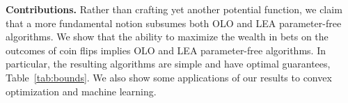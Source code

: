 \textbf{Contributions.} Rather than crafting yet another potential function, we claim that a more fundamental notion
subsumes both \ac{OLO} and \ac{LEA} parameter-free algorithms. We show that the ability to maximize the wealth in bets on the outcomes of coin flips implies \ac{OLO} and \ac{LEA} parameter-free algorithms.
In particular, the resulting algorithms are simple and have optimal guarantees, Table~\ref{tab:bounds}. We also show some applications of our results to convex optimization and machine learning.

\begin{table}
\begin{center}
\end{center}
\end{table}
